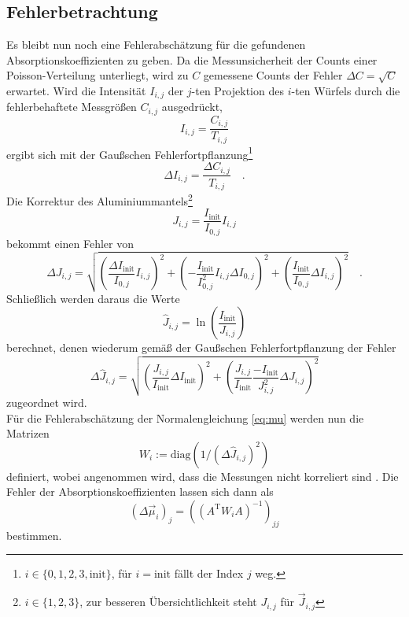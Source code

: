 \subsection{Fehlerbetrachtung}
Es bleibt nun noch eine Fehlerabschätzung für die gefundenen Absorptionskoeffizienten zu geben.
Da die Messunsicherheit der Counts einer Poisson-Verteilung unterliegt, wird zu $C$ gemessene
Counts der Fehler $\Delta C=\sqrt{C}$ erwartet.
Wird die Intensität $I_{i,j}$ der $j$-ten
Projektion des $i$-ten Würfels durch die fehlerbehaftete Messgrößen $C_{i,j}$ ausgedrückt,
\begin{equation}
I_{i,j}=\frac{C_{i,j}}{T_{i,j}}
\end{equation}
ergibt sich mit der Gaußschen Fehlerfortpflanzung\footnote{$i\in \{0,1,2,3,\text{init}\}$, für
$i=\text{init}$ fällt der Index $j$ weg.}
\begin{equation}
\Delta I_{i,j}=\frac{\Delta C_{i,j}}{T_{i,j}} \quad.
\end{equation}
Die Korrektur des Aluminiummantels\footnote{$i\in \{1,2,3\}$, zur besseren Übersichtlichkeit
steht $J_{i,j}$ für $\vec{J}_{i,j}$}
\begin{equation}
J_{i,j}=\frac{I_\text{init}}{I_{0,j}} I_{i,j}
\end{equation}
bekommt einen Fehler von
\begin{equation}
\Delta J_{i,j}= \sqrt{\left(\frac{\Delta I_\text{init}}{I_{0,j}} I_{i,j} \right)^2 +
				\left(- \frac{I_\text{init}}{I_{0,j}^2} I_{i,j} \Delta I_{0,j} \right)^2 +
				\left(\frac{I_\text{init}}{I_{0,j}}\Delta I_{i,j}\right)^2 } \quad.
\end{equation}
Schließlich werden daraus die Werte
\begin{equation}
\hat{J}_{i,j}=\ln\left( \frac{I_\text{init}}{J_{i,j}}  \right)
\end{equation}
berechnet, denen wiederum gemäß der Gaußschen Fehlerfortpflanzung der Fehler
\begin{equation}
\Delta \hat{J}_{i,j}=\sqrt{
\left(\frac{J_{i,j}}{I_\text{init}} \Delta I_\text{init}\right)^2 +
\left(\frac{J_{i,j}}{I_\text{init}} \frac{-I_\text{init}}{J^2_{i,j}} \Delta J_{i,j}\right)^2
}
\end{equation}
zugeordnet wird. \\
Für die Fehlerabschätzung der Normalengleichung \ref{eq:mu} werden nun die Matrizen
\begin{equation}
W_i:=\text{diag} (1/ (\Delta\hat{J}_{i,j})^2)
\end{equation}
definiert, wobei angenommen wird, dass die Messungen nicht korreliert sind \cite{blobel1998statistische} .
Die Fehler der Absorptionskoeffizienten lassen sich dann als
\begin{equation}
\left(\Delta \vec{\mu}_i\right)_j=\left( (A^\text{T}W_i A)^{-1} \right)_{jj}
\end{equation}
bestimmen.

